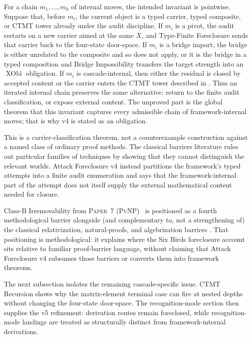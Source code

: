 \documentclass[11pt]{article}
\newcommand{\PaperPvNP}{\textsc{Paper~7 (PvNP)}}
\theoremstyle{definition}
\begin{document}
For a chain \(m_1,\ldots,m_k\) of internal moves, the intended
invariant is pointwise.  Suppose that, before \(m_i\), the current
object is a typed carrier, typed composite, or CTMT tower already under
the audit discipline.  If \(m_i\) is a pivot, the audit restarts on a
new carrier aimed at the same \(X\), and Type-Finite Foreclosure sends
that carrier back to the four-state door-space.  If \(m_i\) is a
bridge import, the bridge is either unrelated to the composite and so
does not apply, or it is the bridge in a typed composition and Bridge
Impossibility transfers the target strength into an
\(\operatorname{XObl}\) obligation.  If \(m_i\) is cascade-internal,
then either the residual is closed by accepted content or the carrier
enters the CTMT tower described in .  Thus an
iterated internal chain preserves the same alternative: return to the
finite audit classification, or expose external content.  The
unproved part is the global theorem that this invariant captures every
admissible chain of framework-internal moves; that is why v4 is stated
as an obligation.

This is a carrier-classification theorem, not a counterexample
construction against a named class of ordinary proof methods.  The
classical barriers literature rules out particular families of
techniques by showing that they cannot distinguish the relevant
worlds.  Attack Foreclosure v4 instead partitions the framework's
typed attempts into a finite audit enumeration and says that the
framework-internal part of the attempt does not itself supply the
external mathematical content needed for closure.

Class-B Irremovability from \PaperPvNP\
\cite{Tsiokos2026PvNP} is positioned as a fourth methodological
barrier alongside (and complementary to, not a strengthening of) the
classical relativization, natural-proofs, and algebrization barriers
\cite{BakerGillSolovay1975Relativization,RazborovRudich1997NaturalProofs,AaronsonWigderson2009Algebrization}.
That positioning is methodological: it explains where the Six Birds
foreclosure account sits relative to familiar proof-barrier language,
without claiming that Attack Foreclosure v4 subsumes those barriers or
converts them into framework theorems.

The next subsection isolates the remaining cascade-specific issue.
CTMT Recursion shows why the matrix-element terminal case can fire at
nested depths without changing the four-state door-space.  The
recognition-mode section then supplies the v5 refinement: derivation
routes remain foreclosed, while recognition-mode landings are treated
as structurally distinct from framework-internal derivations.
\end{document}
